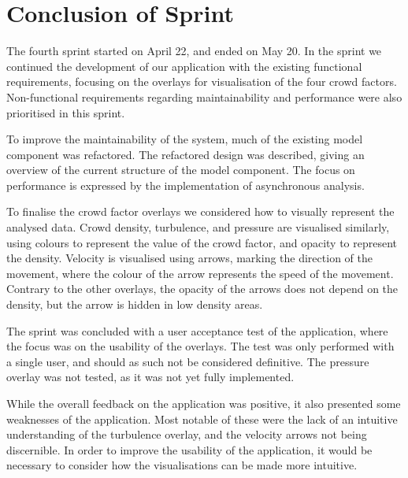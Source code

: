\section{Conclusion of Sprint} \label{sec:s4_conclusion}
The fourth sprint started on April 22, and ended on May 20. In the sprint we continued the development of our application with the existing functional requirements, focusing on the overlays for visualisation of the four crowd factors. Non-functional requirements  regarding maintainability and performance were also prioritised in this sprint.

To improve the maintainability of the system, much of the existing model component was refactored. The refactored design was described, giving an overview of the current structure of the model component. The focus on performance is expressed by the implementation of asynchronous analysis.

To finalise the crowd factor overlays we considered how to visually represent the analysed data. Crowd density, turbulence, and pressure are visualised similarly, using colours to represent the value of the crowd factor, and opacity to represent the density. Velocity is visualised using arrows, marking the direction of the movement, where the colour of the arrow represents the speed of the movement. Contrary to the other overlays, the opacity of the arrows does not depend on the density, but the arrow is hidden in low density areas.

The sprint was concluded with a user acceptance test of the application, where the focus was on the usability of the overlays. The test was only performed with a single user, and should as such not be considered definitive. The pressure overlay was not tested, as it was not yet fully implemented.

While the overall feedback on the application was positive, it also presented some weaknesses of the application. Most notable of these were the lack of an intuitive understanding of the turbulence overlay, and the velocity arrows not being discernible. In order to improve the usability of the application, it would be necessary to consider how the visualisations can be made more intuitive.
